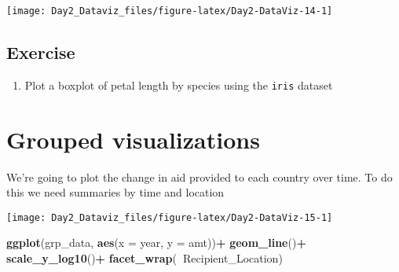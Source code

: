 \documentclass[12pt,letterpaperpaper,openany]{book}
\newenvironment{Shaded}{\begin{snugshade}}{\end{snugshade}}
\newcommand{\DataTypeTok}[1]{\textcolor[rgb]{0.13,0.29,0.53}{#1}}
\newcommand{\KeywordTok}[1]{\textcolor[rgb]{0.13,0.29,0.53}{\textbf{#1}}}
\newcommand{\NormalTok}[1]{#1}
\newcommand{\OperatorTok}[1]{\textcolor[rgb]{0.81,0.36,0.00}{\textbf{#1}}}
\newcommand{\StringTok}[1]{\textcolor[rgb]{0.31,0.60,0.02}{#1}}
\providecommand{\tightlist}{%
  \setlength{\itemsep}{0pt}\setlength{\parskip}{0pt}}
\begin{document}
\texttt{[image: Day2\_Dataviz\_files/figure-latex/Day2-DataViz-14-1]}

\hypertarget{exercise-2}{%
\subsection{Exercise}\label{exercise-2}}

\begin{enumerate}
\def\labelenumi{\arabic{enumi}.}
\tightlist
\item
  Plot a boxplot of petal length by species using the \texttt{iris} dataset
\end{enumerate}

\hypertarget{grouped-visualizations}{%
\section{Grouped visualizations}\label{grouped-visualizations}}

We're going to plot the change in aid provided to each country over time. To do
this we need summaries by time and location

\begin{Shaded}
\end{Shaded}

\texttt{[image: Day2\_Dataviz\_files/figure-latex/Day2-DataViz-15-1]}

\begin{Shaded}
\begin{Highlighting}[]
\KeywordTok{ggplot}\NormalTok{(grp_data, }\KeywordTok{aes}\NormalTok{(}\DataTypeTok{x =}\NormalTok{ year,  }\DataTypeTok{y =}\NormalTok{ amt))}\OperatorTok{+}
\StringTok{  }\KeywordTok{geom_line}\NormalTok{()}\OperatorTok{+}
\StringTok{  }\KeywordTok{scale_y_log10}\NormalTok{()}\OperatorTok{+}
\StringTok{  }\KeywordTok{facet_wrap}\NormalTok{(}\OperatorTok{~}\NormalTok{Recipient_Location)}
\end{Highlighting}
\end{Shaded}
\end{document}
